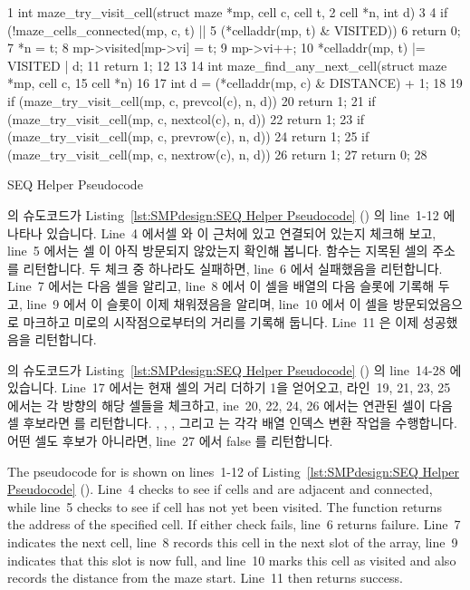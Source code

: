 \begin{listing}[tbp]
{ \scriptsize
\begin{verbbox}
  1 int maze_try_visit_cell(struct maze *mp, cell c, cell t,
  2                         cell *n, int d)
  3 {
  4   if (!maze_cells_connected(mp, c, t) ||
  5       (*celladdr(mp, t) & VISITED))
  6     return 0;
  7   *n = t;
  8   mp->visited[mp->vi] = t;
  9   mp->vi++;
 10   *celladdr(mp, t) |= VISITED | d;
 11   return 1;
 12 }
 13 
 14 int maze_find_any_next_cell(struct maze *mp, cell c,
 15                             cell *n)
 16 {
 17   int d = (*celladdr(mp, c) & DISTANCE) + 1;
 18 
 19   if (maze_try_visit_cell(mp, c, prevcol(c), n, d))
 20     return 1;
 21   if (maze_try_visit_cell(mp, c, nextcol(c), n, d))
 22     return 1;
 23   if (maze_try_visit_cell(mp, c, prevrow(c), n, d))
 24     return 1;
 25   if (maze_try_visit_cell(mp, c, nextrow(c), n, d))
 26     return 1;
 27   return 0;
 28 }
\end{verbbox}
}
\centering
\theverbbox
\caption{SEQ Helper Pseudocode}
\label{lst:SMPdesign:SEQ Helper Pseudocode}
\end{listing}

 의 슈도코드가
Listing~\ref{lst:SMPdesign:SEQ Helper Pseudocode}
() 의 line~1-12 에 나타나
있습니다.
Line~4 에서셀  와  이 근처에 있고 연결되어 있는지 체크해 보고,
line~5 에서는 셀  이 아직 방문되지 않았는지 확인해 봅니다.
 함수는 지목된 셀의 주소를 리턴합니다.
두 체크 중 하나라도 실패하면, line~6 에서 실패했음을 리턴합니다.
Line~7 에서는 다음 셀을 알리고, line~8 에서 이 셀을  배열의
다음 슬롯에 기록해 두고, line~9 에서 이 슬롯이 이제 채워졌음을 알리며, line~10
에서 이 셀을 방문되었음으로 마크하고 미로의 시작점으로부터의 거리를 기록해
둡니다.
Line~11 은 이제 성공했음을 리턴합니다.

 의 슈도코드가
Listing~\ref{lst:SMPdesign:SEQ Helper Pseudocode}
() 의 line~14-28 에 있습니다.
Line~17 에서는 현재 셀의 거리 더하기 1을 얻어오고, 라인~19, 21, 23, 25 에서는
각 방향의 해당 셀들을 체크하고, ine~20, 22, 24, 26 에서는 연관된 셀이 다음 셀
후보라면  를 리턴합니다.
, , , 그리고  는 각각
배열 인덱스 변환 작업을 수행합니다.
어떤 셀도 후보가 아니라면, line~27 에서 false 를 리턴합니다.
\iffalse

The pseudocode for  is shown on lines~1-12
of Listing~\ref{lst:SMPdesign:SEQ Helper Pseudocode}
().
Line~4 checks to see if cells  and  are adjacent and connected,
while line~5 checks to see if cell  has not yet been visited.
The  function returns the address of the specified cell.
If either check fails, line~6 returns failure.
Line~7 indicates the next cell, line~8 records this cell in the next
slot of the  array, line~9 indicates that this slot
is now full, and line~10 marks this cell as visited and also records
the distance from the maze start.  Line~11 then returns success.

